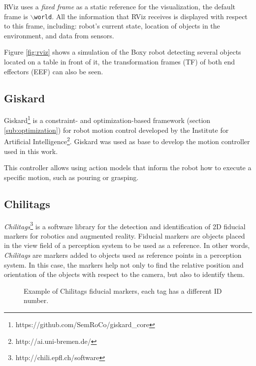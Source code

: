 RViz uses a \textit{fixed frame} as a static reference for the visualization, the default frame is  \texttt{$\backslash$world}. All the information that RViz receives is displayed with respect to this frame, including: robot's current state, location of objects in the environment, and data from sensors.

Figure \ref{fig:rviz} shows a simulation of the Boxy robot detecting several objects located on a table in front of it, the transformation frames (TF) of both end effectors (EEF) can also be seen.

\subsection{Giskard}
\label{subsec:giskard}
Giskard\footnote{https://github.com/SemRoCo/giskard\_core} is a constraint- and optimization-based framework (section \ref{sub:optimization}) for robot motion control developed by the Institute for Artificial Intelligence\footnote{http://ai.uni-bremen.de/}. Giskard was used as base to develop the motion controller used in this work.

This controller allows using action models that inform the robot how to execute a specific motion, such as pouring or grasping.

\subsection{Chilitags}
\label{subsec:chili}

\textit{Chilitags}\footnote{http://chili.epfl.ch/software} is a software library for the detection and identification of 2D fiducial markers for robotics and augmented reality. Fiducial markers are objects placed in the view field of a perception system to be used as a reference. In other words, \textit{Chilitags} are markers added to objects used as reference points in a perception system. In this case, the markers help not only to find the relative position and orientation of the objects with respect to the camera, but also to identify them.
\begin{figure}[H]
	\centering \vspace{-10pt}
	\begin{subfigure}[][Tag 0]
		{\texttt{[image: 0.png]}}
	\end{subfigure}
	\begin{subfigure}[][Tag 1]
		{\texttt{[image: 1.png]}}
	\end{subfigure}
	\begin{subfigure}[][Tag 2]
		{\texttt{[image: 2.png]}}
	\end{subfigure}
	\vspace{-10pt}
	\caption[Example of Chilitags fiducial markers]{Example of Chilitags fiducial markers, each tag has a different ID number.}
	\vspace{-10pt}
	\label{fig:chilitag}
\end{figure}


